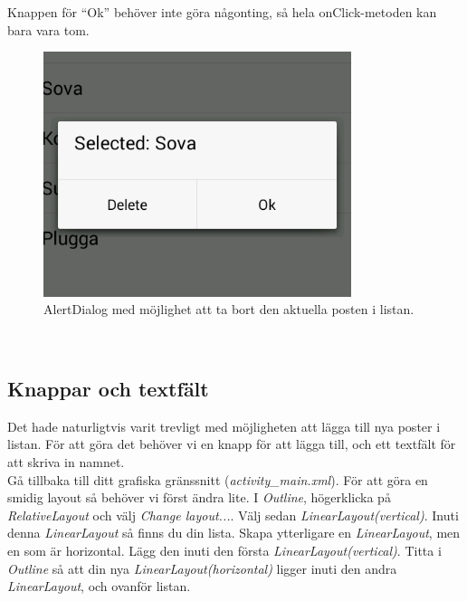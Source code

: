 \documentclass[11 pt, titlepage]{article} %
\begin{document}
Knappen för “Ok” behöver inte göra någonting, så hela onClick-metoden kan bara vara tom.\\

\begin{figure}[ht!]
\centering
\includegraphics[width=90mm]{images/popup.png}
\caption{AlertDialog med möjlighet att ta bort den aktuella posten i listan.}
\label{overflow}
\end{figure} \\


\subsection{Knappar och textfält}
Det hade naturligtvis varit trevligt med möjligheten att lägga till nya poster i listan. För att göra det behöver vi en knapp för att lägga till, och ett textfält för att skriva in namnet.\\

Gå tillbaka till ditt grafiska gränssnitt (\textit{activity\_main.xml}). För att göra en smidig layout så behöver vi först ändra lite. I \textit{Outline}, högerklicka på \textit{RelativeLayout} och välj \textit{Change layout...}. Välj sedan \textit{LinearLayout(vertical)}. Inuti denna \textit{LinearLayout} så finns du din lista. Skapa ytterligare en \textit{LinearLayout}, men en som är horizontal. Lägg den inuti den första \textit{LinearLayout(vertical)}. Titta i \textit{Outline} så att din nya \textit{LinearLayout(horizontal)} ligger inuti den andra \textit{LinearLayout}, och ovanför listan.\\
\end{document}
